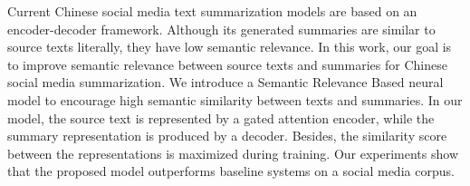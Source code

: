 Current Chinese social media text summarization models are based on an encoder-decoder framework. Although its generated summaries are similar to source texts literally, they have low semantic relevance. In this work, our goal is to improve semantic relevance between source texts and summaries for Chinese social media summarization. We introduce a Semantic Relevance Based neural model to encourage high semantic similarity between texts and summaries. In our model, the source text is represented by a gated attention encoder, while the summary representation is produced by a decoder. Besides, the similarity score between the representations is maximized during training. Our experiments show that the proposed model outperforms baseline systems on a social media corpus.
